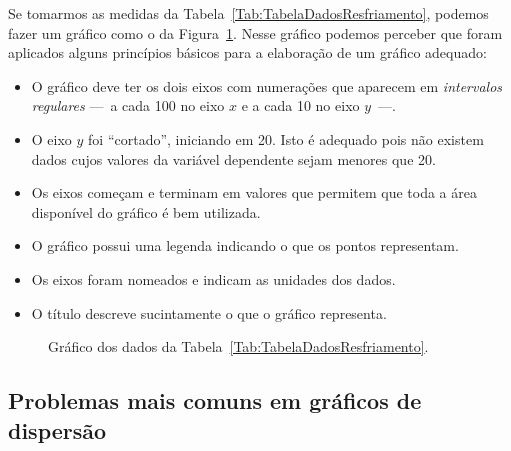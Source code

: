 Se tomarmos as medidas da Tabela~\ref{Tab:TabelaDadosResfriamento}, podemos fazer um gráfico como o da Figura~\ref{Fig:GraficoResfriamento}. Nesse gráfico podemos perceber que foram aplicados alguns princípios básicos para a elaboração de um gráfico adequado:
\begin{itemize}
	\item O gráfico deve ter os dois eixos com numerações que aparecem em \emph{intervalos regulares} ---~a cada 100 no eixo $x$ e a cada 10 no eixo $y$~---.
	\item O eixo $y$ foi ``cortado'', iniciando em 20. Isto é adequado pois não existem dados cujos valores da variável dependente sejam menores que 20.
	\item Os eixos começam e terminam em valores que permitem que toda a área disponível do gráfico é bem utilizada.
	\item O gráfico possui uma legenda indicando o que os pontos representam.
	\item Os eixos foram nomeados e indicam as unidades dos dados.
	\item O título descreve sucintamente o que o gráfico representa. \end{itemize}

\begin{figure}[!htb]
\centering
\caption{Gráfico dos dados da Tabela~\ref{Tab:TabelaDadosResfriamento}.}
\label{Fig:GraficoResfriamento}

\end{figure}

\subsection{Problemas mais comuns em gráficos de dispersão}

